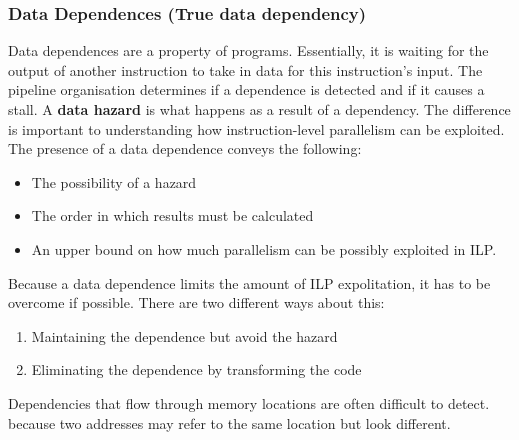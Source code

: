 \documentclass[11pt]{article}
\begin{document}
\subsubsection{Data Dependences (True data dependency)}
Data dependences are a property of programs. Essentially, it is waiting for the output of another instruction to take in data for this instruction's input. The pipeline organisation determines if a dependence is detected and if it causes a stall. A \textbf{data hazard} is what happens as a result of a dependency. The difference is important to understanding how instruction-level parallelism can be exploited.
\n
The presence of a data dependence conveys the following:
\begin{itemize}
\item The possibility of a hazard
\item The order in which results must be calculated
\item An upper bound on how much parallelism can be possibly exploited in ILP.
\end{itemize}
\noindent
Because a data dependence limits the amount of ILP expolitation, it has to be overcome if possible. There are two different ways about this:
\begin{enumerate}
\item Maintaining the dependence but avoid the hazard
\item Eliminating the dependence by transforming the code
\end{enumerate}
Dependencies that flow through memory locations are often difficult to detect. because two addresses may refer to the same location but look different.
\end{document}
